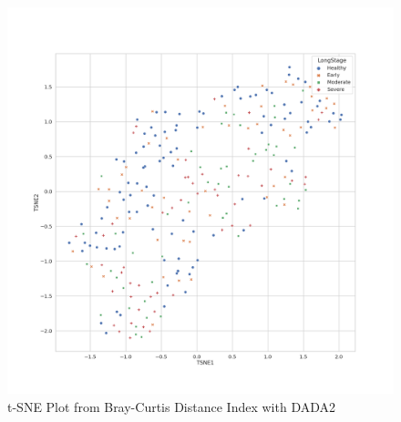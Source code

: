 \documentclass[a4paper]{article}
\begin{document}
            \begin{figure}[p]
                \centering
                \includegraphics[width=0.6 \linewidth]{figures/BetaDiversity/DADA2.bray_curtis.png}
                \caption{t-SNE Plot from Bray-Curtis Distance Index with DADA2}
                \label{fig:tsne-bray-dada2}
            \end{figure}
\end{document}
